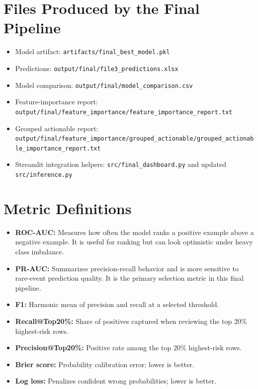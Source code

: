 \documentclass[11pt]{article}
\newcommand{\feature}[1]{\texttt{#1}}
\begin{document}
\appendix
\section{Files Produced by the Final Pipeline}
\begin{itemize}
    \item Model artifact: \feature{artifacts/final\_best\_model.pkl}
    \item Predictions: \feature{output/final/file3\_predictions.xlsx}
    \item Model comparison: \feature{output/final/model\_comparison.csv}
    \item Feature-importance report: \feature{output/final/feature\_importance/feature\_importance\_report.txt}
    \item Grouped actionable report: \feature{output/final/feature\_importance/grouped\_actionable/grouped\_actionable\_importance\_report.txt}
    \item Streamlit integration helpers: \feature{src/final\_dashboard.py} and updated \feature{src/inference.py}
\end{itemize}

\section{Metric Definitions}
\begin{itemize}
    \item \textbf{ROC-AUC:} Measures how often the model ranks a positive example above a negative example. It is useful for ranking but can look optimistic under heavy class imbalance.
    \item \textbf{PR-AUC:} Summarizes precision-recall behavior and is more sensitive to rare-event prediction quality. It is the primary selection metric in this final pipeline.
    \item \textbf{F1:} Harmonic mean of precision and recall at a selected threshold.
    \item \textbf{Recall@Top20\%:} Share of positives captured when reviewing the top 20\% highest-risk rows.
    \item \textbf{Precision@Top20\%:} Positive rate among the top 20\% highest-risk rows.
    \item \textbf{Brier score:} Probability calibration error; lower is better.
    \item \textbf{Log loss:} Penalizes confident wrong probabilities; lower is better.
\end{itemize}
\end{document}
